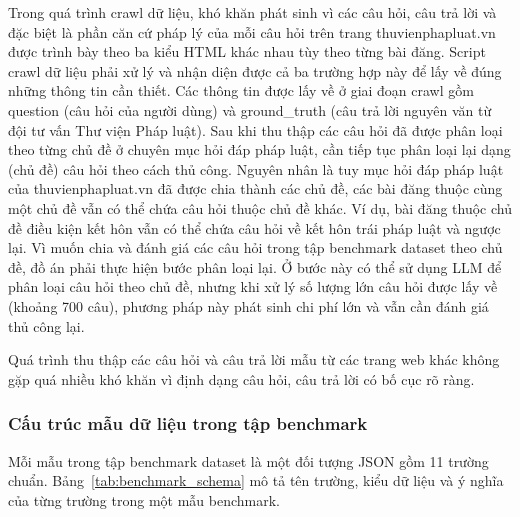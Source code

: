 \documentclass[../DoAn.tex]{subfiles}
\begin{document}
Trong quá trình crawl dữ liệu, khó khăn phát sinh vì các câu hỏi, câu trả lời và đặc biệt là phần căn cứ pháp lý của mỗi câu hỏi trên trang thuvienphapluat.vn được trình bày theo ba kiểu HTML khác nhau tùy theo từng bài đăng. Script crawl dữ liệu phải xử lý và nhận diện được cả ba trường hợp này để lấy về đúng những thông tin cần thiết. Các thông tin được lấy về ở giai đoạn crawl gồm question (câu hỏi của người dùng) và ground\_truth (câu trả lời nguyên văn từ đội tư vấn Thư viện Pháp luật). Sau khi thu thập các câu hỏi đã được phân loại theo từng chủ đề ở chuyên mục hỏi đáp pháp luật, cần tiếp tục phân loại lại dạng (chủ đề) câu hỏi theo cách thủ công. Nguyên nhân là tuy mục hỏi đáp pháp luật của thuvienphapluat.vn đã được chia thành các chủ đề, các bài đăng thuộc cùng một chủ đề vẫn có thể chứa câu hỏi thuộc chủ đề khác. Ví dụ, bài đăng thuộc chủ đề điều kiện kết hôn vẫn có thể chứa câu hỏi về kết hôn trái pháp luật và ngược lại. Vì muốn chia và đánh giá các câu hỏi trong tập benchmark dataset theo chủ đề, đồ án phải thực hiện bước phân loại lại. Ở bước này có thể sử dụng LLM để phân loại câu hỏi theo chủ đề, nhưng khi xử lý số lượng lớn câu hỏi được lấy về (khoảng 700 câu), phương pháp này phát sinh chi phí lớn và vẫn cần đánh giá thủ công lại.

Quá trình thu thập các câu hỏi và câu trả lời mẫu từ các trang web khác không gặp quá nhiều khó khăn vì định dạng câu hỏi, câu trả lời có bố cục rõ ràng.

\subsubsection{Cấu trúc mẫu dữ liệu trong tập benchmark}

Mỗi mẫu trong tập benchmark dataset là một đối tượng JSON gồm 11 trường chuẩn. Bảng~\ref{tab:benchmark_schema} mô tả tên trường, kiểu dữ liệu và ý nghĩa của từng trường trong một mẫu benchmark.
\end{document}
